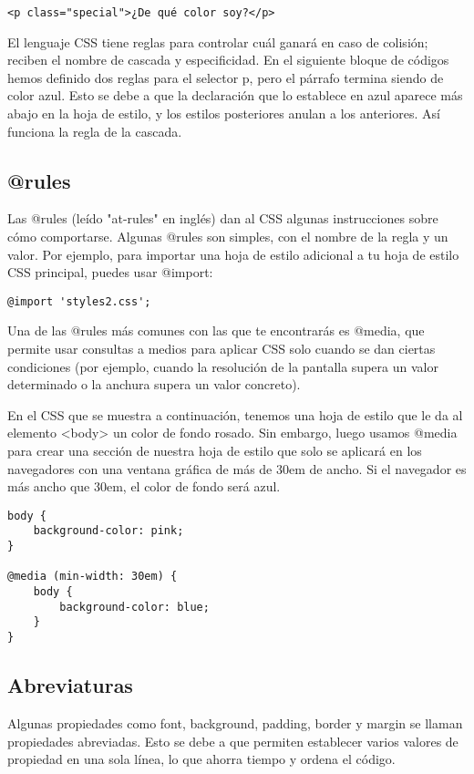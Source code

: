 \begin{lstlisting}
<p class="special">¿De qué color soy?</p>
\end{lstlisting}

El lenguaje CSS tiene reglas para controlar cuál ganará en caso de colisión; reciben el nombre de cascada y especificidad. En el siguiente bloque de códigos hemos definido dos reglas para el selector p, pero el párrafo termina siendo de color azul. Esto se debe a que la declaración que lo establece en azul aparece más abajo en la hoja de estilo, y los estilos posteriores anulan a los anteriores. Así funciona la regla de la cascada.

\subsection{@rules}
Las @rules (leído "at-rules" en inglés) dan al CSS algunas instrucciones sobre cómo comportarse. Algunas @rules son simples, con el nombre de la regla y un valor. Por ejemplo, para importar una hoja de estilo adicional a tu hoja de estilo CSS principal, puedes usar @import:

\begin{lstlisting}
@import 'styles2.css';
\end{lstlisting}

Una de las @rules más comunes con las que te encontrarás es @media, que permite usar consultas a medios para aplicar CSS solo cuando se dan ciertas condiciones (por ejemplo, cuando la resolución de la pantalla supera un valor determinado o la anchura supera un valor concreto).

En el CSS que se muestra a continuación, tenemos una hoja de estilo que le da al elemento <body> un color de fondo rosado. Sin embargo, luego usamos @media para crear una sección de nuestra hoja de estilo que solo se aplicará en los navegadores con una ventana gráfica de más de 30em de ancho. Si el navegador es más ancho que 30em, el color de fondo será azul.

\begin{lstlisting}
body {
	background-color: pink;
}

@media (min-width: 30em) {
	body {
		background-color: blue;
	}
}
\end{lstlisting}

\subsection{Abreviaturas}
Algunas propiedades como font, background, padding, border y margin se llaman propiedades abreviadas. Esto se debe a que permiten establecer varios valores de propiedad en una sola línea, lo que ahorra tiempo y ordena el código.

